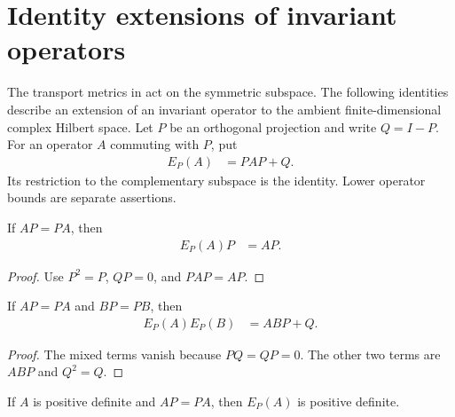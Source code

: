 \section{Identity extensions of invariant operators}
\label{sec:projection-identity-extension}

The transport metrics in \cite[Section~7]{OpenAI2026AreaLaw} act on the
symmetric subspace. The following identities describe an extension of an
invariant operator to the ambient finite-dimensional complex Hilbert space.
Let $P$ be an orthogonal projection and write $Q=I-P$. For an operator $A$
commuting with $P$, put
\begin{align*}
 E_P(A)&=PAP+Q.
\end{align*}
Its restriction to the complementary subspace is the identity. Lower
operator bounds are separate assertions.

\begin{lemma}
\label{lem:projection-identity-extension-restriction}
\leanok
If $AP=PA$, then
\begin{align*}
 E_P(A)P&=AP.
\end{align*}
\end{lemma}

\begin{proof}
\leanok
Use $P^2=P$, $QP=0$, and $PAP=AP$.
\end{proof}

\begin{lemma}
\label{lem:projection-identity-extension-product}
\leanok
If $AP=PA$ and $BP=PB$, then
\begin{align*}
 E_P(A)E_P(B)&=ABP+Q.
\end{align*}
\end{lemma}

\begin{proof}
\leanok
The mixed terms vanish because $PQ=QP=0$. The other two terms are $ABP$
and $Q^2=Q$.
\end{proof}

\begin{lemma}
\label{lem:projection-identity-extension-positivity}
\leanok
If $A$ is positive definite and $AP=PA$, then $E_P(A)$ is positive definite.
\end{lemma}

